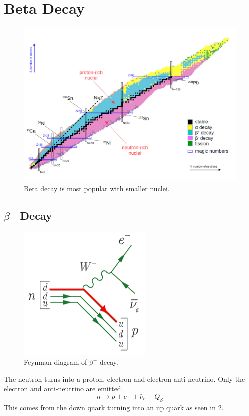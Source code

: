 \section{Beta Decay}
\begin{figure}[ht!]
\centering
\includegraphics[width = \textwidth]{radioactive_nuclei_chart.png}
\caption{Beta decay is most popular with smaller nuclei.}
\label{fig: radioactive_nuclei_chart_2}
\end{figure}

\subsection{$β^{-}$ Decay}
\vspace{1mm}
\begin{figure}
\centering
\vspace{-12.5mm}
\includegraphics[width = .35\textwidth]{beta_minus_decay.png}
\caption{Feynman diagram of $β^{-}$ decay.}
\label{fig: beta_minus_decay}
\end{figure}
The neutron turns into a proton, electron and electron anti-neutrino. Only the electron and anti-neutrino are emitted. 
\begin{equation}
    n \rightarrow p + e^{-} + \bar{\nu}_{e} + Q_β
\end{equation}
This comes from the down quark turning into an up quark as seen in \cref{fig: beta_minus_decay}.



